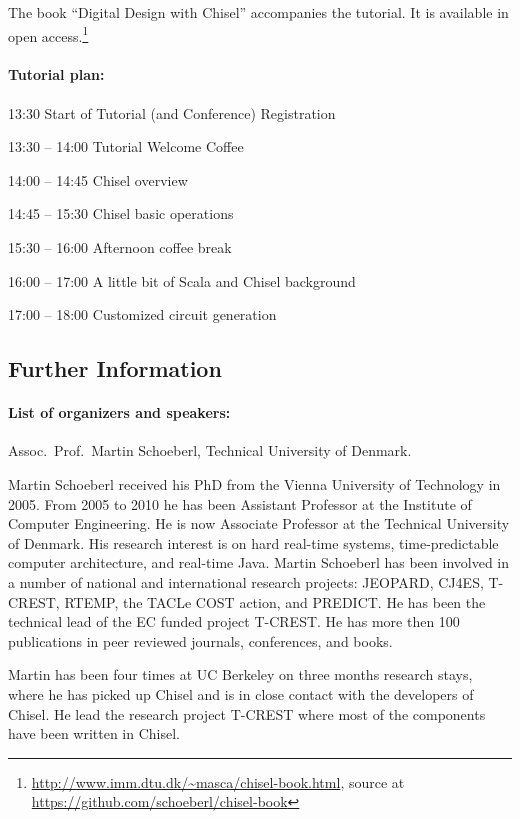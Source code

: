 \documentclass{article}
\begin{document}
The book ``Digital Design with Chisel'' accompanies the tutorial.
It is available in open access.\footnote{\url{http://www.imm.dtu.dk/~masca/chisel-book.html}, source at \url{https://github.com/schoeberl/chisel-book}}


\paragraph{Tutorial plan:}

13:30 Start of Tutorial (and Conference) Registration

13:30 -- 14:00 Tutorial Welcome Coffee

14:00 -- 14:45 Chisel overview

14:45 -- 15:30 Chisel basic operations

15:30 -- 16:00 Afternoon coffee break


16:00 -- 17:00 A little bit of Scala and Chisel background 

17:00 -- 18:00 Customized circuit generation


\subsection*{Further Information}

\paragraph{List of organizers and speakers:}
Assoc.~Prof.~Martin Schoeberl, Technical University of Denmark.

Martin Schoeberl received his PhD from the Vienna University of Technology in 2005. From 2005 to 2010 he has been Assistant Professor at the Institute of Computer Engineering. He is now Associate Professor at the Technical University of Denmark. His research interest is on hard real-time systems, time-predictable computer architecture, and real-time Java.  Martin Schoeberl has been involved in a number of national and international research projects: JEOPARD, CJ4ES, T-CREST, RTEMP, the TACLe COST action, and PREDICT.  He has been the technical lead of the EC funded project T-CREST.  He has more then 100 publications in peer reviewed journals, conferences, and books.

Martin has been four times at UC Berkeley on three months research stays, where he has picked up Chisel
and is in close contact with the developers of Chisel.
He lead the research project T-CREST where most of the components have been written in Chisel.
\end{document}
